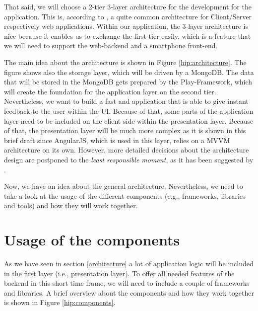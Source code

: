 That said, we will choose a 2-tier 3-layer architecture for the development for the application. This is, according to \cite{Eckerson1995}, a quite common architecture for Client/Server respectively web applications. Within our application, the 3-layer architecture is nice because it enables us to exchange the first tier easily, which is a feature that we will need to support the web-backend and a smartphone front-end. 

The main idea about the architecture is shown in Figure \ref{hip:architecture}. The figure shows also the storage layer, which will be driven by a MongoDB. The data that will be stored in the MongoDB gets prepared by the Play-Framework, which will create the foundation for the application layer on the second tier. Nevertheless, we want to build a fast and application that is able to give instant feedback to the user within the \ac{UI}. Because of that, some parts of the application layer need to be included on the client side within the presentation layer. Because of that, the presentation layer will be much more complex as it is shown in this brief draft since AngularJS, which is used in this layer, relies on a \ac{MVVM} architecture on its own.
However, more detailed decisions about the architecture design are postponed to the \textit{least responsible moment}, as it has been suggested by \cite{Mast2013}.

Now, we have an idea about the general architecture. Nevertheless, we need to take a look at the usage of the different components (e.g., frameworks, libraries and tools) and how they will work together.

\section{Usage of the components}
As we have seen in section \ref{architecture} a lot of application logic will be included in the first layer (i.e., presentation layer). To offer all needed features of the backend in this short time frame, we will need to include a couple of frameworks and libraries. A brief overview about the components and how they work together is shown in Figure \ref{hip:components}. 

